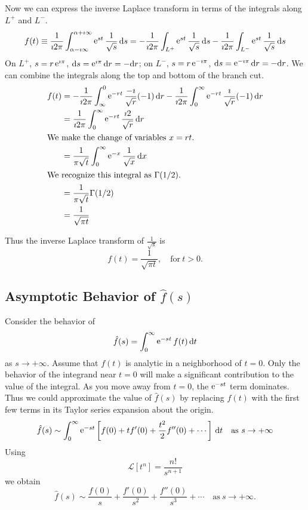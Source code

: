 \begin{Example}
  Now we can express the inverse Laplace transform in terms of the integrals
  along $L^+$ and $L^-$.
  \[
  f(t) \equiv \frac{1}{\imath 2 \pi} \int_{\alpha - \imath \infty}^{\alpha + \imath \infty} \mathop{\mathrm{e}}\nolimits^{s t} \frac{1}{\sqrt{s}}\,\mathrm{d} s 
  = - \frac{1}{\imath 2 \pi}\int_{L^+} \mathop{\mathrm{e}}\nolimits^{s t} \frac{1}{\sqrt{s}}\,\mathrm{d} s 
  - \frac{1}{\imath 2 \pi}\int_{L^-} \mathop{\mathrm{e}}\nolimits^{s t} \frac{1}{\sqrt{s}}\,\mathrm{d} s
  \]
  On $L^+$, $s = r \mathop{\mathrm{e}}\nolimits^{\imath \pi}$, $\mathrm{d} s = \mathop{\mathrm{e}}\nolimits^{\imath \pi} \mathrm{d} r = - \mathrm{d} r$; 
  on $L^-$, $s = r \mathop{\mathrm{e}}\nolimits^{-\imath \pi}$, $\mathrm{d} s = \mathop{\mathrm{e}}\nolimits^{-\imath \pi} \mathrm{d} r = - \mathrm{d} r$.
  We can combine the integrals along the top and bottom of the branch cut.
  \begin{align*}
    f(t)
    &= - \frac{1}{\imath 2 \pi}\int_{\infty}^0 \mathop{\mathrm{e}}\nolimits^{-r t} \frac{-\imath}{\sqrt{r}} (-1)\,\mathrm{d} r
    - \frac{1}{\imath 2 \pi} \int_{0}^{\infty} \mathop{\mathrm{e}}\nolimits^{-r t} \frac{\imath}{\sqrt{r}} (-1)\,\mathrm{d} r \\
    &= \frac{1}{\imath 2 \pi} \int_0^{\infty} \mathop{\mathrm{e}}\nolimits^{-r t} \frac{\imath 2}{\sqrt{r}}\,\mathrm{d} r \\
    \intertext{We make the change of variables $x = r t$.}
    &= \frac{1}{\pi \sqrt{t}} \int_0^\infty \mathop{\mathrm{e}}\nolimits^{-x} \frac{1}{\sqrt{x}}\,\mathrm{d} x \\
    \intertext{We recognize this integral as $\Gamma(1/2)$.}
    &= \frac{1}{\pi \sqrt{t}} \Gamma(1/2) \\
    &= \frac{1}{\sqrt{\pi t}}
  \end{align*}

  Thus the inverse Laplace transform of $\frac{1}{\sqrt{s}}$ is
  \[ 
  \boxed{ 
    f(t) = \frac{1}{\sqrt{\pi t}}, \quad \mathrm{for}\ t > 0.
    } 
  \]
\end{Example}







\subsection{Asymptotic Behavior of $\hat{f}(s)$}



Consider the behavior of
\[
\hat{f}(s) = \int_0^\infty \mathop{\mathrm{e}}\nolimits^{-s t} f(t) \,\mathrm{d} t
\]
as $s \to + \infty$.  Assume that $f(t)$ is analytic in a neighborhood
of $t = 0$. Only the behavior of the integrand near $t = 0$ will
make a significant contribution to the value of the integral.  As you
move away from $t = 0$, the $\mathop{\mathrm{e}}\nolimits^{-s t}$ term dominates.  Thus we could
approximate the value of $\hat{f}(s)$ by replacing $f(t)$ with the first few
terms in its Taylor series expansion about the origin.
\[
\hat{f}(s) \sim \int_0^\infty \mathop{\mathrm{e}}\nolimits^{-s t} \left[ f(0) + t f'(0) + \frac{t^2}{2} f''(0)
  + \cdots \right] \,\mathrm{d} t \quad \mathrm{as}\ s \to +\infty
\]
Using
\[
\mathcal{L}\left[ t^n \right] = \frac{n!}{s^{n+1}}
\]
we obtain
\[
\boxed{
  \hat{f}(s) \sim \frac{f(0)}{s} + \frac{f'(0)}{s^2} + \frac{f''(0)}{s^3} +
  \cdots \quad \mathrm{as}\ s \to +\infty.
  }
\]




